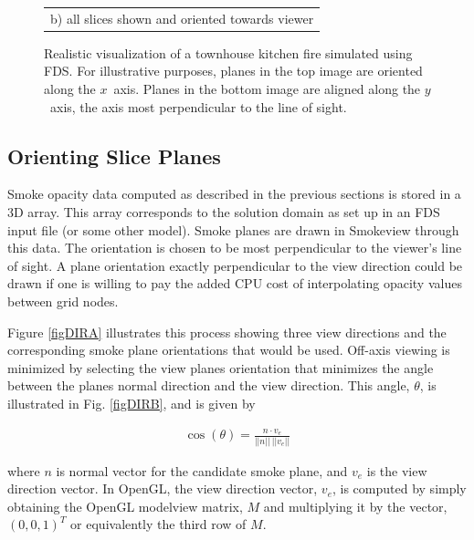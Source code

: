 {\begin{figure}[\figoptions]
\begin{center}
\begin{tabular}{l}
b) all slices shown and oriented towards viewer \\
\end{tabular}
\end{center}
\caption[Realistic visualization of a townhouse kitchen fire
simulated using FDS.]{Realistic visualization of a townhouse
kitchen fire simulated using FDS. For illustrative purposes,
planes in the top image are oriented along the $x$~axis.  Planes
in the bottom image are aligned along the $y$~axis, the axis most
perpendicular to the line of sight.}
\label{figsmoke3d}%
\end{figure}


\subsection{Orienting Slice Planes}

Smoke opacity data computed as described in the previous sections
is stored in a 3D array. This array corresponds to the solution
domain as set up in an FDS input file (or some other model). Smoke
planes are drawn in Smokeview through this data.  The orientation
is chosen to be most perpendicular to the viewer's line of sight.
A plane orientation exactly perpendicular to the view direction
could be drawn if one is willing to pay the added CPU cost of
interpolating opacity values between grid nodes.

Figure \ref{figDIRA} illustrates this process showing three view
directions and the corresponding smoke plane orientations that
would be used. Off-axis viewing is minimized by selecting the view
planes orientation that minimizes the angle between the planes
normal direction and the view direction. This angle, $\theta$, is
illustrated in Fig. \ref{figDIRB}, and is given by

\begin{eqnarray}
\cos(\theta)=\frac{n\cdot v_e}{||n||~||v_e||}
\end{eqnarray}

\noindent where $n$ is normal vector for the candidate smoke
plane, and $v_e$ is the view direction vector.  In OpenGL, the
view direction vector, $v_e$, is computed by simply obtaining the
OpenGL modelview matrix, $M$ and multiplying it by the vector,
$(0,0,1)^T$ or equivalently the third row of $M$.

}
